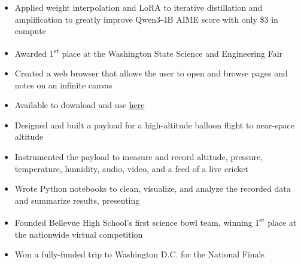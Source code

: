 \documentclass[9pt,a4paper,ragged2e]{altacv}
\begin{document}
\begin{itemize} \itemsep 0pt
    \item Applied weight interpolation and LoRA to iterative distillation and amplification to greatly improve Qwen3-4B AIME score with only \$3 in compute
    \item Awarded 1\textsuperscript{st} place at the Washington State Science and Engineering Fair
\end{itemize}

\divider

\begin{itemize} \itemsep 0pt
    \item Created a web browser that allows the user to open and browse pages and notes on an infinite canvas
    \item Available to download and use \href{http://github.com/oof-baroomf/muon}{here}
\end{itemize}


\divider



\begin{itemize} \itemsep 0pt
    \item Designed and built a payload for a high-altitude balloon flight to near-space altitude
    \item Instrumented the payload to measure and record altitude, pressure, temperature, humidity, audio, video, and a feed of a live cricket
    \item Wrote Python notebooks to clean, visualize, and analyze the recorded data and summarize results, presenting
\end{itemize}

\begin{itemize} \itemsep 0pt
  \item Founded Bellevue High School's first science bowl team, winning 1\textsuperscript{st} place at the nationwide virtual competition
  \item Won a fully-funded trip to Washington D.C. for the National Finals
\end{itemize}

 \divider
\end{document}
